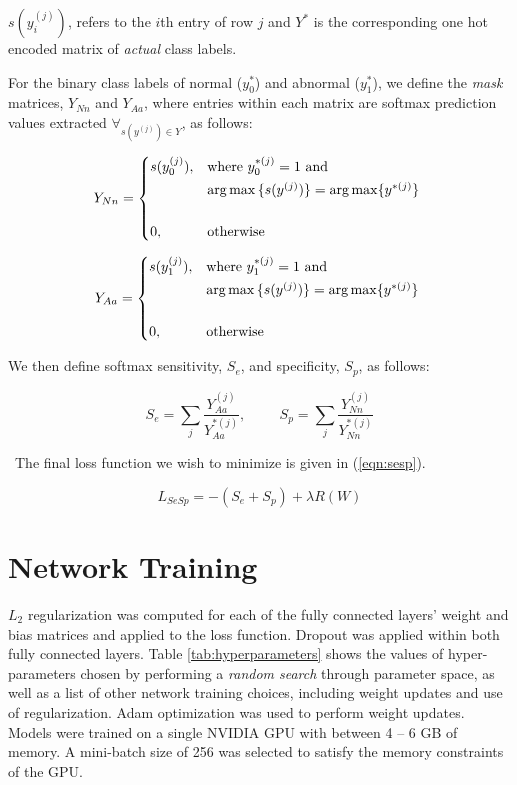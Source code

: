 \documentclass{article}
\DeclareMathOperator*{\argmax}{arg\,max}
\begin{document}
 $s(y_i^{(j)})$, refers to the $i$th entry of row $j$ and $Y^*$ is the corresponding one hot encoded matrix of \emph{actual} class labels. 



For the binary class labels of normal ($y_0^*$) and abnormal ($y_1^*$), we define the \emph{mask} matrices, $Y_{Nn}$ and $Y_{Aa}$, where entries within each matrix are softmax prediction values extracted $\forall_{s(y^{(j)}) \in Y}$, as follows:

\[
Y_{Nn} = 
\begin{dcases*}
    s(y_0^{(j)}), & where $y_0^{*(j)} = 1$ and \\
     & $\argmax{\{s(y^{(j)})\}} = \argmax\{y^{*(j)}\} $ \\
      & \\
    0, & otherwise
\end{dcases*}
\]

\[
Y_{Aa} = 
\begin{dcases*}
    s(y_1^{(j)}), & where $y_1^{*(j)} = 1$ and \\
     & $\argmax{\{s(y^{(j)})\}} = \argmax\{y^{*(j)}\} $ \\
      & \\
    0, & otherwise
\end{dcases*}
\]

We then define softmax sensitivity, $S_e$, and specificity, $S_p$, as follows:

\begin{equation}
S_e = \sum\limits_j{\frac{Y_{Aa}^{(j)}}{Y_{Aa}^{*(j)}}},  \hspace{1cm} S_p = \sum\limits_j{\frac{Y_{Nn}^{(j)}}{Y_{Nn}^{*(j)}}}
\end{equation}

\noindent~The final loss function we wish to minimize is given in (\ref{eqn:sesp}).

\begin{equation}
\label{eqn:sesp}
L_{SeSp} = - (S_e + S_p) + \lambda R(W)
\end{equation}


\section{Network Training}
\label{sec:training}

$L_2$ regularization was computed for each of the fully connected layers' weight and bias matrices and applied to the loss function. Dropout was applied within both fully connected layers. Table \ref{tab:hyperparameters} shows the values of hyper-parameters chosen by performing a \emph{random search} through parameter space, as well as a list of other network training choices, including weight updates and use of regularization. Adam optimization \cite{DBLP:journals/corr/KingmaB14} was used to perform weight updates. Models were trained on a single NVIDIA GPU with between 4 -- 6 GB of memory. A mini-batch size of 256 was selected to satisfy the memory constraints of the GPU.
\end{document}
